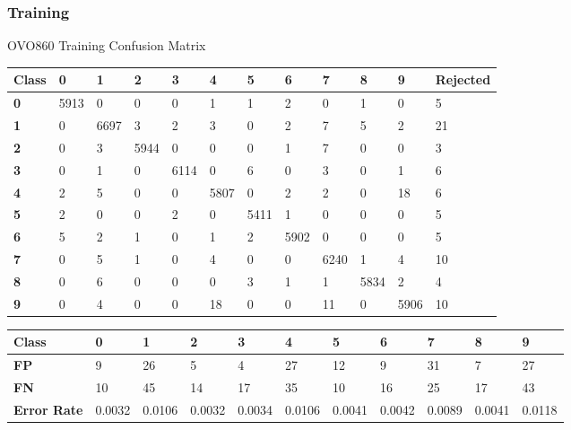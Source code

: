 \documentclass[
  a4paper,            %
  DIV=10,             %
  oneside,            %
  BCOR=5mm,           %
  parskip=half,       %
  numbers=noenddot,   %
  bibtotoc,           %
  listof=totoc,        %
  article
]{scrreprt}
\begin{document}
\subsubsection{Training}
\begin{center}
  \small{OVO860 Training Confusion Matrix}
  \begin{tabular}{|p{1cm}|p{1cm}|p{1cm}|p{1cm}|p{1cm}|p{1cm}|p{1cm}|p{1cm}|p{1cm}|p{1cm}|p{1cm}|p{1.7cm}|}
    \hline
    \textbf{Class} & \textbf{0} & \textbf{1} & \textbf{2} & \textbf{3} & \textbf{4} & \textbf{5} & \textbf{6} & \textbf{7} & \textbf{8} & \textbf{9} & \textbf{Rejected} \\
    \hline
    \textbf{0} & 5913 & 0 & 0 & 0 & 1 & 1 & 2 & 0 & 1 & 0 & 5 \\
    \hline
    \textbf{1} & 0 & 6697 & 3 & 2 & 3 & 0 & 2 & 7 & 5 & 2 & 21 \\
    \hline
    \textbf{2} & 0 & 3 & 5944 & 0 & 0 & 0 & 1 & 7 & 0 & 0 & 3 \\
    \hline
    \textbf{3} & 0 & 1 & 0 & 6114 & 0 & 6 & 0 & 3 & 0 & 1 & 6 \\
    \hline
    \textbf{4} & 2 & 5 & 0 & 0 & 5807 & 0 & 2 & 2 & 0 & 18 & 6 \\
    \hline
    \textbf{5} & 2 & 0 & 0 & 2 & 0 & 5411 & 1 & 0 & 0 & 0 & 5 \\
    \hline
    \textbf{6} & 5 & 2 & 1 & 0 & 1 & 2 & 5902 & 0 & 0 & 0 & 5 \\
    \hline
    \textbf{7} & 0 & 5 & 1 & 0 & 4 & 0 & 0 & 6240 & 1 & 4 & 10 \\
    \hline
    \textbf{8} & 0 & 6 & 0 & 0 & 0 & 3 & 1 & 1 & 5834 & 2 & 4 \\
    \hline
    \textbf{9} & 0 & 4 & 0 & 0 & 18 & 0 & 0 & 11 & 0 & 5906 & 10 \\
    \hline
  \end{tabular}
\end{center}

\begin{center}
  \begin{tabular}{|p{1cm}|p{1cm}|p{1cm}|p{1cm}|p{1cm}|p{1cm}|p{1cm}|p{1cm}|p{1cm}|p{1cm}|p{1cm}|}
    \hline
    \textbf{Class} & \textbf{0} & \textbf{1} & \textbf{2} & \textbf{3} & \textbf{4} & \textbf{5} & \textbf{6} & \textbf{7} & \textbf{8} & \textbf{9} \\
    \hline
    \textbf{FP} & 9 & 26 & 5 & 4 & 27 & 12 & 9 & 31 & 7 & 27 \\
    \hline
    \textbf{FN} & 10 & 45 & 14 & 17 & 35 & 10 & 16 & 25 & 17 & 43 \\
    \hline
    \textbf{Error Rate} & 0.0032 & 0.0106 & 0.0032 & 0.0034 & 0.0106 & 0.0041 & 0.0042 & 0.0089 & 0.0041 & 0.0118 \\
    \hline
  \end{tabular}
\end{center}
\end{document}
